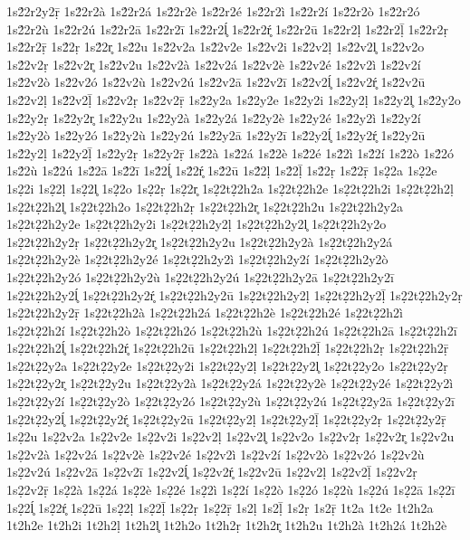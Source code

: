 {1s2́2r2y2ṝ
1s2́2r2à
1s2́2r2á
1s2́2r2è
1s2́2r2é
1s2́2r2ì
1s2́2r2í
1s2́2r2ò
1s2́2r2ó
1s2́2r2ù
1s2́2r2ú
1s2́2r2ā
1s2́2r2ī
1s2́2r2ĺ̥
1s2́2r2ŕ̥
1s2́2r2ū
1s2́2r2ḷ
1s2́2r2ḹ
1s2́2r2ṛ
1s2́2r2ṝ
1s2́2ṛ
1s2́2r̥
1s2́2u
1s2́2v2a
1s2́2v2e
1s2́2v2i
1s2́2v2ḷ
1s2́2v2l̥
1s2́2v2o
1s2́2v2ṛ
1s2́2v2r̥
1s2́2v2u
1s2́2v2à
1s2́2v2á
1s2́2v2è
1s2́2v2é
1s2́2v2ì
1s2́2v2í
1s2́2v2ò
1s2́2v2ó
1s2́2v2ù
1s2́2v2ú
1s2́2v2ā
1s2́2v2ī
1s2́2v2ĺ̥
1s2́2v2ŕ̥
1s2́2v2ū
1s2́2v2ḷ
1s2́2v2ḹ
1s2́2v2ṛ
1s2́2v2ṝ
1s2́2y2a
1s2́2y2e
1s2́2y2i
1s2́2y2ḷ
1s2́2y2l̥
1s2́2y2o
1s2́2y2ṛ
1s2́2y2r̥
1s2́2y2u
1s2́2y2à
1s2́2y2á
1s2́2y2è
1s2́2y2é
1s2́2y2ì
1s2́2y2í
1s2́2y2ò
1s2́2y2ó
1s2́2y2ù
1s2́2y2ú
1s2́2y2ā
1s2́2y2ī
1s2́2y2ĺ̥
1s2́2y2ŕ̥
1s2́2y2ū
1s2́2y2ḷ
1s2́2y2ḹ
1s2́2y2ṛ
1s2́2y2ṝ
1s2́2à
1s2́2á
1s2́2è
1s2́2é
1s2́2ì
1s2́2í
1s2́2ò
1s2́2ó
1s2́2ù
1s2́2ú
1s2́2ā
1s2́2ī
1s2́2ĺ̥
1s2́2ŕ̥
1s2́2ū
1s2́2ḷ
1s2́2ḹ
1s2́2ṛ
1s2́2ṝ
1s2̣2a
1s2̣2e
1s2̣2i
1s2̣2ḷ
1s2̣2l̥
1s2̣2o
1s2̣2ṛ
1s2̣2r̥
1s2̣2t2̣2h2a
1s2̣2t2̣2h2e
1s2̣2t2̣2h2i
1s2̣2t2̣2h2ḷ
1s2̣2t2̣2h2l̥
1s2̣2t2̣2h2o
1s2̣2t2̣2h2ṛ
1s2̣2t2̣2h2r̥
1s2̣2t2̣2h2u
1s2̣2t2̣2h2y2a
1s2̣2t2̣2h2y2e
1s2̣2t2̣2h2y2i
1s2̣2t2̣2h2y2ḷ
1s2̣2t2̣2h2y2l̥
1s2̣2t2̣2h2y2o
1s2̣2t2̣2h2y2ṛ
1s2̣2t2̣2h2y2r̥
1s2̣2t2̣2h2y2u
1s2̣2t2̣2h2y2à
1s2̣2t2̣2h2y2á
1s2̣2t2̣2h2y2è
1s2̣2t2̣2h2y2é
1s2̣2t2̣2h2y2ì
1s2̣2t2̣2h2y2í
1s2̣2t2̣2h2y2ò
1s2̣2t2̣2h2y2ó
1s2̣2t2̣2h2y2ù
1s2̣2t2̣2h2y2ú
1s2̣2t2̣2h2y2ā
1s2̣2t2̣2h2y2ī
1s2̣2t2̣2h2y2ĺ̥
1s2̣2t2̣2h2y2ŕ̥
1s2̣2t2̣2h2y2ū
1s2̣2t2̣2h2y2ḷ
1s2̣2t2̣2h2y2ḹ
1s2̣2t2̣2h2y2ṛ
1s2̣2t2̣2h2y2ṝ
1s2̣2t2̣2h2à
1s2̣2t2̣2h2á
1s2̣2t2̣2h2è
1s2̣2t2̣2h2é
1s2̣2t2̣2h2ì
1s2̣2t2̣2h2í
1s2̣2t2̣2h2ò
1s2̣2t2̣2h2ó
1s2̣2t2̣2h2ù
1s2̣2t2̣2h2ú
1s2̣2t2̣2h2ā
1s2̣2t2̣2h2ī
1s2̣2t2̣2h2ĺ̥
1s2̣2t2̣2h2ŕ̥
1s2̣2t2̣2h2ū
1s2̣2t2̣2h2ḷ
1s2̣2t2̣2h2ḹ
1s2̣2t2̣2h2ṛ
1s2̣2t2̣2h2ṝ
1s2̣2t2̣2y2a
1s2̣2t2̣2y2e
1s2̣2t2̣2y2i
1s2̣2t2̣2y2ḷ
1s2̣2t2̣2y2l̥
1s2̣2t2̣2y2o
1s2̣2t2̣2y2ṛ
1s2̣2t2̣2y2r̥
1s2̣2t2̣2y2u
1s2̣2t2̣2y2à
1s2̣2t2̣2y2á
1s2̣2t2̣2y2è
1s2̣2t2̣2y2é
1s2̣2t2̣2y2ì
1s2̣2t2̣2y2í
1s2̣2t2̣2y2ò
1s2̣2t2̣2y2ó
1s2̣2t2̣2y2ù
1s2̣2t2̣2y2ú
1s2̣2t2̣2y2ā
1s2̣2t2̣2y2ī
1s2̣2t2̣2y2ĺ̥
1s2̣2t2̣2y2ŕ̥
1s2̣2t2̣2y2ū
1s2̣2t2̣2y2ḷ
1s2̣2t2̣2y2ḹ
1s2̣2t2̣2y2ṛ
1s2̣2t2̣2y2ṝ
1s2̣2u
1s2̣2v2a
1s2̣2v2e
1s2̣2v2i
1s2̣2v2ḷ
1s2̣2v2l̥
1s2̣2v2o
1s2̣2v2ṛ
1s2̣2v2r̥
1s2̣2v2u
1s2̣2v2à
1s2̣2v2á
1s2̣2v2è
1s2̣2v2é
1s2̣2v2ì
1s2̣2v2í
1s2̣2v2ò
1s2̣2v2ó
1s2̣2v2ù
1s2̣2v2ú
1s2̣2v2ā
1s2̣2v2ī
1s2̣2v2ĺ̥
1s2̣2v2ŕ̥
1s2̣2v2ū
1s2̣2v2ḷ
1s2̣2v2ḹ
1s2̣2v2ṛ
1s2̣2v2ṝ
1s2̣2à
1s2̣2á
1s2̣2è
1s2̣2é
1s2̣2ì
1s2̣2í
1s2̣2ò
1s2̣2ó
1s2̣2ù
1s2̣2ú
1s2̣2ā
1s2̣2ī
1s2̣2ĺ̥
1s2̣2ŕ̥
1s2̣2ū
1s2̣2ḷ
1s2̣2ḹ
1s2̣2ṛ
1s2̣2ṝ
1s2ḷ
1s2ḹ
1s2ṛ
1s2ṝ
1t2a
1t2e
1t2h2a
1t2h2e
1t2h2i
1t2h2ḷ
1t2h2l̥
1t2h2o
1t2h2ṛ
1t2h2r̥
1t2h2u
1t2h2à
1t2h2á
1t2h2è
}
